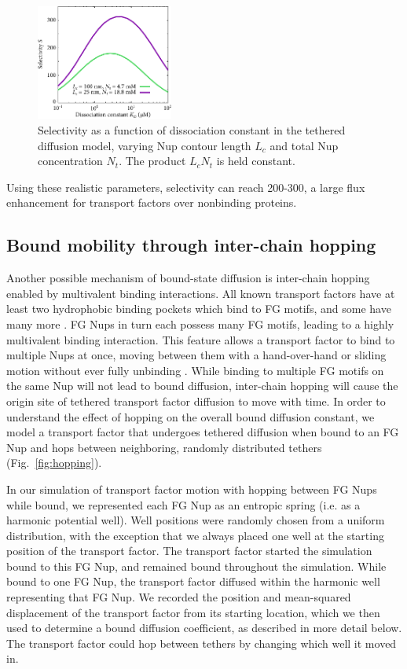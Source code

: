 \begin{figure}
\centering
\includegraphics[width=0.4\textwidth]{figs/ch02/chain-comparison.pdf}
\caption[Nup contour length and concentration comparison.]{Selectivity as a function of dissociation
  constant in the tethered diffusion model, varying Nup contour length $L_c$ and total Nup concentration $N_t$.  The product $L_cN_t$ is held constant.}
\label{fig:chainComparison}
\end{figure}

 Using these realistic parameters, selectivity can reach 200-300, a large flux enhancement for transport factors over nonbinding proteins.

\subsection{Bound mobility through inter-chain hopping}
\label{sec:hopping}

Another possible mechanism of bound-state diffusion is inter-chain hopping enabled by multivalent binding interactions.  All known transport factors have at least two hydrophobic binding pockets which bind to FG motifs, and some have many more \cite{wagner15}.  FG Nups in turn each possess many FG motifs, leading to a highly multivalent binding interaction.  This feature allows a transport factor to bind to multiple Nups at once, moving between them with a hand-over-hand or sliding motion without ever fully unbinding \cite{raveh16, tetenbaum-novatt12}.  While binding to multiple FG motifs on the same Nup will not lead to bound diffusion, inter-chain hopping will cause the origin site of tethered transport factor diffusion to move with time.  In order to understand the effect of hopping on the overall bound diffusion constant, we model a transport factor that undergoes tethered diffusion when bound to an FG Nup and hops between neighboring, randomly distributed tethers (Fig.~\ref{fig:hopping}).

In our simulation of transport factor motion with hopping between FG Nups while bound, we represented each FG Nup as an entropic spring (i.e. as a harmonic potential well).  Well positions were randomly chosen from a uniform distribution, with the exception that we always placed one well at the starting position of the transport factor.  The transport factor started the simulation bound to this FG Nup, and remained bound throughout the simulation.  While bound to one FG Nup, the transport factor diffused within the harmonic well representing that FG Nup. We recorded the position and mean-squared displacement of the transport factor from its starting location, which we then used to determine a bound diffusion coefficient, as described in more detail below.  The transport factor could hop between tethers by changing which well it moved in.

